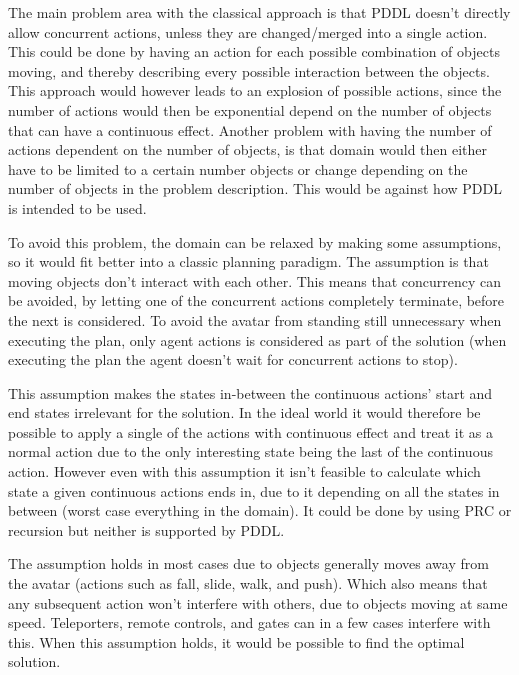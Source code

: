 		The main problem area with the classical approach is that PDDL doesn't directly allow concurrent actions, unless they are changed/merged into a single action. This could be done by having an action for each possible combination of objects moving, and thereby describing every possible interaction between the objects. This approach would however leads to an explosion of possible actions, since the number of actions would then be exponential depend on the number of objects that can have a continuous effect. %
		Another problem with having the number of actions dependent on the number of objects, is that domain would then either have to be limited to a certain number objects or change depending on the number of objects in the problem description. This would be against how PDDL is intended to be used. 
	
		To avoid this problem, the domain can be relaxed by making some assumptions, so it would fit better into a classic planning paradigm. The assumption is that moving objects don't interact with each other. This means that concurrency can be avoided, by letting one of the concurrent actions completely terminate, before the next is considered. 
		To avoid the avatar from standing still unnecessary when executing the plan, only agent actions is considered as part of the solution (when executing the plan the agent doesn't wait for concurrent actions to stop).
		
		This assumption makes the states in-between the continuous actions' start and end states irrelevant for the solution. In the ideal world it would therefore be possible to apply a single of the actions with continuous effect and treat it as a normal action due to the only interesting state being the last of the continuous action. However even with this assumption it isn't feasible to calculate which state a given continuous actions ends in, due to it depending on all the states in between (worst case everything in the domain). It could be done by using PRC or recursion but neither is supported by PDDL.
		
		
		The assumption holds in most cases due to objects generally moves away from the avatar (actions such as fall, slide, walk, and push). Which also means that any subsequent action won't interfere with others, due to objects moving at same speed. Teleporters, remote controls, and gates can in a few cases interfere with this. When this assumption holds, it would be possible to find the optimal solution.
		

